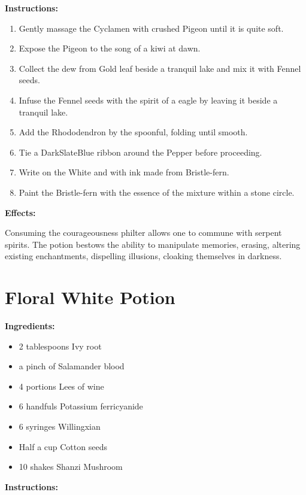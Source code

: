 \documentclass{article}
\begin{document}
\textbf{Instructions:}

\begin{enumerate}
  \item Gently massage the Cyclamen with crushed Pigeon until it is quite soft.
  \item Expose the Pigeon to the song of a kiwi at dawn.
  \item Collect the dew from Gold leaf beside a tranquil lake and mix it with Fennel seeds.
  \item Infuse the Fennel seeds with the spirit of a eagle by leaving it beside a tranquil lake.
  \item Add the Rhododendron by the spoonful, folding until smooth.
  \item Tie a DarkSlateBlue ribbon around the Pepper before proceeding.
  \item Write on the White and with ink made from Bristle-fern.
  \item Paint the Bristle-fern with the essence of the mixture within a stone circle.
\end{enumerate}

\textbf{Effects:}

Consuming the courageousness philter allows one to commune with serpent spirits. The potion bestows the ability to manipulate memories, erasing, altering existing enchantments, dispelling illusions, cloaking themselves in darkness.

\newpage
\section*{Floral White Potion}

\textbf{Ingredients:}

\begin{itemize}
  \item 2 tablespoons Ivy root
  \item a pinch of Salamander blood
  \item 4 portions Lees of wine
  \item 6 handfuls Potassium ferricyanide
  \item 6 syringes Willingxian
  \item Half a cup Cotton seeds
  \item 10 shakes Shanzi Mushroom
\end{itemize}

\textbf{Instructions:}
\end{document}
